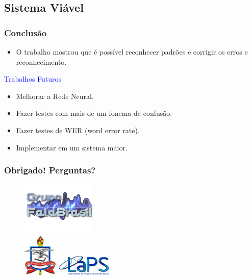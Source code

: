 \documentclass{beamer}
\begin{document}
      \subsection{Sistema Viável}
      \begin{frame}
	\frametitle{Conclusão}
	\begin{itemize}
	  \item O trabalho mostrou que é possível reconhecer padrões e corrigir os erros e reconhecimento.
	\end{itemize}\vspace{0.5in}
	\pause
	\textcolor{blue}{\large Trabalhos Futuros}
	\begin{itemize}
	  \item Melhorar a Rede Neural.
	  \item Fazer testes com mais de um fonema de confusão.
	  \item Fazer testes de WER (word error rate).
	  \item Implementar em um sistema maior.
	\end{itemize}
      \end{frame}
      \begin{frame}
	\large
	\frametitle{Obrigado! Perguntas?}
	\begin{figure}
	  \includegraphics[height=1in]{logo}\\
	  \includegraphics[height=0.8in]{logo_ufpa}
	  \includegraphics[height=0.4in]{logo_laps}\\
	\end{figure}
      \end{frame}

      
\end{document}
